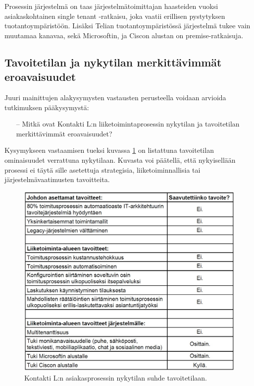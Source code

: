 \documentclass[finnish,12pt,a4paper,pdftex]{article}
\begin{document}
\noindent Prosessin järjestelmä on taas järjestelmätoimittajan haasteiden vuoksi asiakaskohtainen single tenant -ratkaisu, joka vaatii erillisen pystytyksen tuotantoympäristöön. Lisäksi Telian tuotantoympäristössä järjestelmä tukee vain muutamaa kanavaa, sekä  Microsoftin, ja Ciscon alustan on premise-ratkaisuja.\\

\subsection{Tavoitetilan ja nykytilan merkittävimmät eroavaisuudet}

Juuri mainittujen alakysymysten vastausten perusteella voidaan arvioida tutkimuksen pääkysymystä:

\begin{itemize}
    \item [--] Mitkä ovat Kontakti L:n liiketoimintaprosessin nykytilan ja tavoitetilan merkittävimmät
eroavaisuudet?
\end{itemize}

\noindent Kysymykseen vastaamisen tueksi kuvassa \ref{fig:erot} on listattuna tavoitetilan ominaisuudet verrattuna nykytilaan. Kuvasta voi päätellä, että nykyisellään prosessi ei täytä sille asetettuja strategisia, liiketoiminnallisia tai järjestelmävaatimusten tavoitteita.\\ 

\begin{figure}[!h]
    \centering
    \includegraphics[scale=0.3]{images/eroavaisuudet.jpg}
   \caption{Kontakti L:n asiakasprosessin nykytilan suhde tavoitetilaan.}
    \label{fig:erot}
\end{figure}
\end{document}
